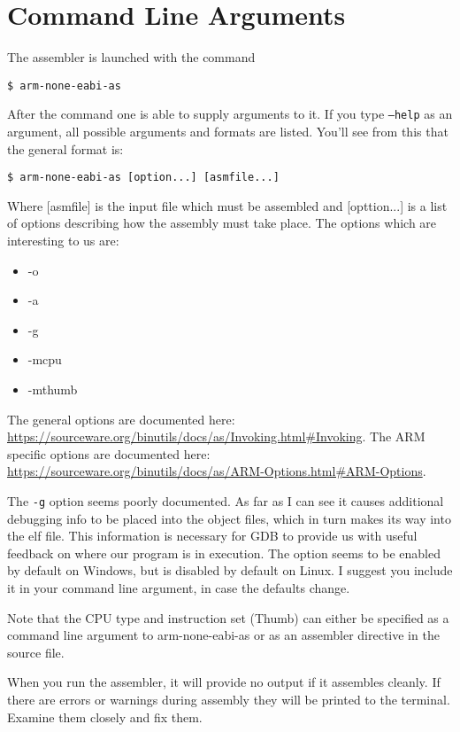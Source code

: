 \section{Command Line Arguments}
The assembler is launched with the command
\begin{lstlisting}[style=BashStyle]
$ arm-none-eabi-as
\end{lstlisting}
After the command one is able to supply arguments to it. If you type \texttt{--help} as an argument, all possible arguments and formats are listed. You'll see from this that the general format is:
\begin{lstlisting}[style=BashStyle]
$ arm-none-eabi-as [option...] [asmfile...]
\end{lstlisting}
Where [asmfile] is the input file which must be assembled and [opttion...] is a list of options describing how the assembly must take place. The options which are interesting to us are:
\begin{itemize}
  \item -o
  \item -a
  \item -g
  \item -mcpu
  \item -mthumb
\end{itemize}
The general options are documented here: \url{https://sourceware.org/binutils/docs/as/Invoking.html#Invoking}. The ARM specific options are documented here: \url{https://sourceware.org/binutils/docs/as/ARM-Options.html#ARM-Options}.

The \texttt{-g} option seems poorly documented. As far as I can see it causes additional debugging info to be placed into the object files, which in turn makes its way into the elf file. This information is necessary for GDB to provide us with useful feedback on where our program is in execution. The option seems to be enabled by default on Windows, but is disabled by default on Linux. I suggest you include it in your command line argument, in case the defaults change. 

Note that the CPU type and instruction set (Thumb) can either be specified as a command line argument to arm-none-eabi-as or as an assembler directive in the source file. 

When you run the assembler, it will provide no output if it assembles cleanly. If there are errors or warnings during assembly they will be printed to the terminal. Examine them closely and fix them.

